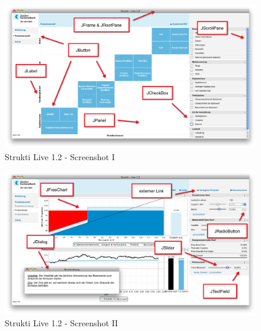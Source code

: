   \begin{figure}[htb]
    \begin{center}
      \includegraphics[width=\textwidth]{./image/SL/SL-01.png}
      \caption{Strukti Live 1.2 - Screenshot I}
      \label{img:SL-01}
    \end{center}
  \end{figure}
  
  \begin{figure}[htb]
    \begin{center}
      \includegraphics[width=\textwidth]{./image/SL/SL-02.png}
      \caption{Strukti Live 1.2 - Screenshot II}
      \label{img:SL-02}
    \end{center}
  \end{figure}
  
